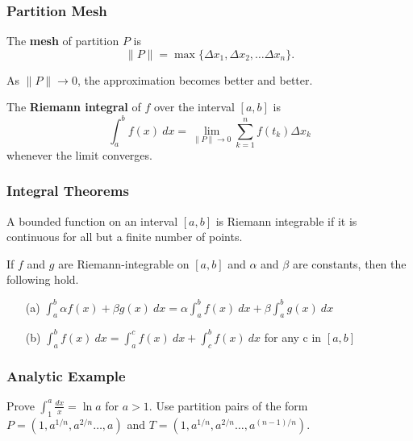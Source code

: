 \documentclass{beamer}
\begin{document}
\begin{frame}
\frametitle{Partition Mesh}
\begin{Definition}
The {\bf mesh} of partition $P$ is
$$
\| P\| = \max\{\Delta x_1,\Delta x_2,\ldots \Delta x_n\}.
$$
\end{Definition}
As $\| P\| \to 0$, the approximation becomes better and better.
\end{frame}

\begin{frame}

\begin{Definition}
The {\bf Riemann integral} of $f$ over the interval $[a, b]$ is
$$
\int_a^b f(x)\ dx = \lim_{\|P\|\to 0} \sum_{k = 1}^n f(t_k) \Delta x_k
$$
whenever the limit converges. 
\end{Definition} 
\end{frame}

\begin{frame}
\frametitle{Integral Theorems}

\begin{Theorem}
A bounded function on an interval $[a, b]$ is Riemann integrable if it is continuous for all but a finite number of points. 
\end{Theorem}

\begin{Theorem}
If $f$ and $g$ are Riemann-integrable on $[a, b]$ and $\alpha$ and $\beta$ are constants, then the following hold.
\begin{enumerate}
\item[(a)] $\displaystyle \int_a^b \alpha f(x) + \beta g(x)\ dx = \alpha \int_a^b f(x)\ dx + \beta \int_a^b g(x)\ dx$
\item[(b)] $\displaystyle \int_a^b f(x)\ dx = \int_a^c f(x)\ dx + \int_c^b f(x)\ dx$ for any c in $[a, b]$
\end{enumerate}
\end{Theorem}
\end{frame}

\begin{frame}[t]
\frametitle{Analytic Example}
\small
\begin{Example}
Prove $\displaystyle\int_1^a \frac{dx}{x} = \ln a$ for $a > 1$. Use partition pairs of the form $P = (1, a^{1/n}, a^{2/n}\ldots, a)$ and $T = (1, a^{1/n}, a^{2/n}\ldots, a^{(n-1)/n})$.
\end{Example}
\end{frame}
\end{document}
